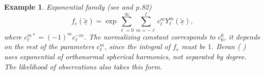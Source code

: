 \documentclass[preprint,11pt,a4paper]{elsarticle}
\newtheorem{example}[theorem]{Example}
\begin{document}
\begin{example}
Exponential family (see \cite{beran1979exponential} and \cite%
{watson1983statistics} p.82)%
\begin{equation}
f_{e}\left( \underline{\widetilde{x}}\right)
=\exp\sum_{\ell=0}^{\infty}\sum_{m=-\ell}^{\ell}c_{\ell}^{m}Y_{\ell}^{m}%
\left( \underline{\widetilde{x}}\right) ,  \label{Exp_family}
\end{equation}
where $c_{\ell}^{m\ast}=\left( -1\right) ^{m}c_{\ell}^{-m}$. The normalizing
constant corresponds to $c_{0}^{0}$, it depends on the rest of the
parameters $c_{\ell}^{m}$, since the integral of $f_{e}$ must be $1$. Beran (%
\cite{beran1979exponential}) uses exponential of orthonormal spherical
harmonics, not separated by degree. The likelihood of observations also
takes this form. \newline
\end{example}
\end{document}

